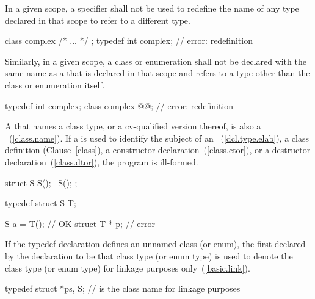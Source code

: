 \pnum
In a given scope, a  specifier shall not be used to
redefine the name of any type declared in that scope to refer to a
different type.
\enterexample

\begin{codeblock}
class complex { /* ... */ };
typedef int complex;            // error: redefinition
\end{codeblock}
\exitexample

\pnum
Similarly, in a given scope, a class or enumeration shall not be
declared with the same name as a  that is
declared in that scope and refers to a type other than the class or
enumeration itself.
\enterexample

\begin{codeblock}
typedef int complex;
class complex @@;   // error: redefinition
\end{codeblock}
\exitexample

\pnum
\enternote
{}%
A  that names a class type, or a cv-qualified
version thereof, is also a ~(\ref{class.name}). If
a  is used to identify the subject of an
~(\ref{dcl.type.elab}), a class
definition (Clause~\ref{class}), a constructor
declaration~(\ref{class.ctor}), or a destructor
declaration~(\ref{class.dtor}), the program is ill-formed.
\exitnote
\enterexample

\begin{codeblock}
struct S {
  S();
  ~S();
};

typedef struct S T;

S a = T();                      // OK
struct T * p;                   // error
\end{codeblock}
\exitexample

\pnum
{}%
%
%
If the typedef declaration defines an unnamed class (or enum), the first
 declared by the declaration to be that class
type (or enum type) is used to denote the class type (or enum type) for
linkage purposes only~(\ref{basic.link}).
\enterexample

\begin{codeblock}
typedef struct { } *ps, S;      //  is the class name for linkage purposes
\end{codeblock}
\exitexample

